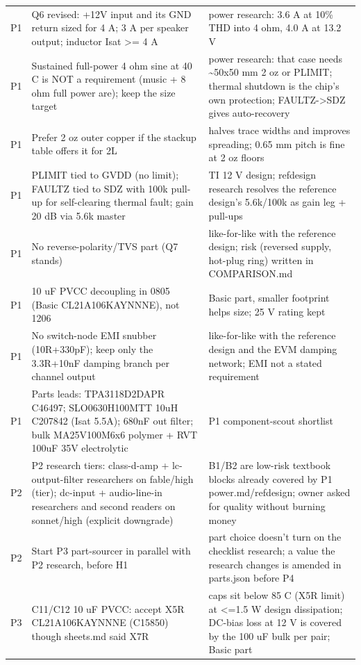 \documentclass[11pt]{article}
\begin{document}
{\begin{longtable}{lp{5.2cm}p{7.2cm}}
P1 & Q6 revised: +12V input and its GND return sized for 4 A; 3 A per speaker output; inductor Isat \textgreater{}= 4 A & power research: 3.6 A at 10\% THD into 4 ohm, 4.0 A at 13.2 V \\
P1 & Sustained full-power 4 ohm sine at 40 C is NOT a requirement (music + 8 ohm full power are); keep the size target & power research: that case needs \textasciitilde{}50x50 mm 2 oz or PLIMIT; thermal shutdown is the chip's own protection; FAULTZ-\textgreater{}SDZ gives auto-recovery \\
P1 & Prefer 2 oz outer copper if the stackup table offers it for 2L & halves trace widths and improves spreading; 0.65 mm pitch is fine at 2 oz floors \\
P1 & PLIMIT tied to GVDD (no limit); FAULTZ tied to SDZ with 100k pull-up for self-clearing thermal fault; gain 20 dB via 5.6k master & TI 12 V design; refdesign research resolves the reference design's 5.6k/100k as gain leg + pull-ups \\
P1 & No reverse-polarity/TVS part (Q7 stands) & like-for-like with the reference design; risk (reversed supply, hot-plug ring) written in COMPARISON.md \\
P1 & 10 uF PVCC decoupling in 0805 (Basic CL21A106KAYNNNE), not 1206 & Basic part, smaller footprint helps size; 25 V rating kept \\
P1 & No switch-node EMI snubber (10R+330pF); keep only the 3.3R+10nF damping branch per channel output & like-for-like with the reference design and the EVM damping network; EMI not a stated requirement \\
P1 & Parts leads: TPA3118D2DAPR C46497; SLO0630H100MTT 10uH C207842 (Isat 5.5A); 680nF out filter; bulk MA25V100M6x6 polymer + RVT 100uF 35V electrolytic & P1 component-scout shortlist \\
P2 & P2 research tiers: class-d-amp + lc-output-filter researchers on fable/high (tier); dc-input + audio-line-in researchers and second readers on sonnet/high (explicit downgrade) & B1/B2 are low-risk textbook blocks already covered by P1 power.md/refdesign; owner asked for quality without burning money \\
P2 & Start P3 part-sourcer in parallel with P2 research, before H1 & part choice doesn't turn on the checklist research; a value the research changes is amended in parts.json before P4 \\
P3 & C11/C12 10 uF PVCC: accept X5R CL21A106KAYNNNE (C15850) though sheets.md said X7R & caps sit below 85 C (X5R limit) at \textless{}=1.5 W design dissipation; DC-bias loss at 12 V is covered by the 100 uF bulk per pair; Basic part \\

\end{longtable}}
\end{document}
